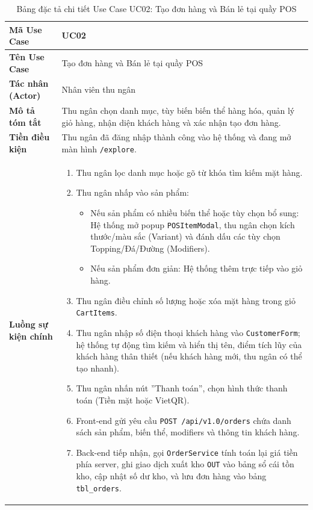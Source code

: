 \begin{table}[htbp]
\centering
\caption{Bảng đặc tả chi tiết Use Case UC02: Tạo đơn hàng và Bán lẻ tại quầy POS}
\label{tab:uc02_pos}
\vspace{2mm}
\begin{tabularx}{\textwidth}{|l|X|}
\hline
\textbf{Mã Use Case} & \textbf{UC02} \\ \hline
\textbf{Tên Use Case} & Tạo đơn hàng và Bán lẻ tại quầy POS \\ \hline
\textbf{Tác nhân (Actor)} & Nhân viên thu ngân \\ \hline
\textbf{Mô tả tóm tắt} & Thu ngân chọn danh mục, tùy biến biến thể hàng hóa, quản lý giỏ hàng, nhận diện khách hàng và xác nhận tạo đơn hàng. \\ \hline
\textbf{Tiền điều kiện} & Thu ngân đã đăng nhập thành công vào hệ thống và đang mở màn hình \texttt{/explore}. \\ \hline
\textbf{Luồng sự kiện chính} & 
\begin{enumerate}[leftmargin=*, nosep]
    \item Thu ngân lọc danh mục hoặc gõ từ khóa tìm kiếm mặt hàng.
    \item Thu ngân nhấp vào sản phẩm:
    \begin{itemize}
        \item Nếu sản phẩm có nhiều biến thể hoặc tùy chọn bổ sung: Hệ thống mở popup \texttt{POSItemModal}, thu ngân chọn kích thước/màu sắc (Variant) và đánh dấu các tùy chọn Topping/Đá/Đường (Modifiers).
        \item Nếu sản phẩm đơn giản: Hệ thống thêm trực tiếp vào giỏ hàng.
    \end{itemize}
    \item Thu ngân điều chỉnh số lượng hoặc xóa mặt hàng trong giỏ \texttt{CartItems}.
    \item Thu ngân nhập số điện thoại khách hàng vào \texttt{CustomerForm}; hệ thống tự động tìm kiếm và hiển thị tên, điểm tích lũy của khách hàng thân thiết (nếu khách hàng mới, thu ngân có thể tạo nhanh).
    \item Thu ngân nhấn nút ''Thanh toán'', chọn hình thức thanh toán (Tiền mặt hoặc VietQR).
    \item Front-end gửi yêu cầu \texttt{POST /api/v1.0/orders} chứa danh sách sản phẩm, biến thể, modifiers và thông tin khách hàng.
    \item Back-end tiếp nhận, gọi \texttt{OrderService} tính toán lại giá tiền phía server, ghi giao dịch xuất kho \texttt{OUT} vào bảng sổ cái tồn kho, cập nhật số dư kho, và lưu đơn hàng vào bảng \texttt{tbl\_orders}.

\end{enumerate}
\end{tabularx}
\end{table}
